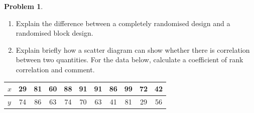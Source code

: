 \documentclass[11pt,a4paper]{article}
\theoremstyle{definition}
\newtheorem{problemx}{Problem}[section]
\newenvironment{problem}{\begin{problemx}}{\end{problemx}}
\begin{document}
\begin{problem}
\begin{enumerate}
\item[(a).] Explain the difference between a completely randomised design and a randomised
block design.
\item[(b).] Explain briefly how a scatter diagram can show whether there is correlation
between two quantities. For the data below, calculate a coefficient of rank correlation and
comment.
\end{enumerate}
\begin{table}[H]
\centering
\begin{tabular}{|l|c|c|c|c|c|c|c|c|c|c|}
\hline
$x$ & 29 & 81 & 60 & 88 & 91 & 91 & 86 & 99 & 72 & 42\\
\hline
$y$ & 74 & 86 & 63 & 74 & 70 & 63 & 41 & 81 & 29 & 56\\
\hline
\end{tabular}
\end{table}
\end{problem}
\end{document}
